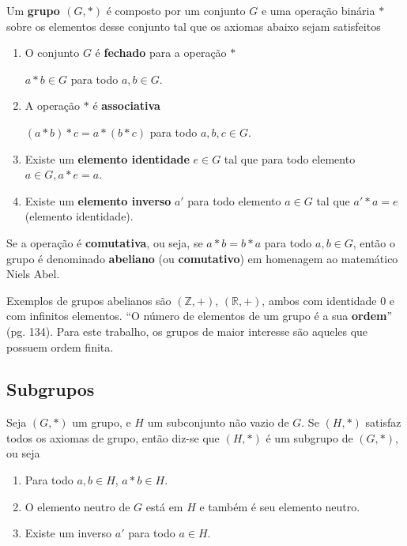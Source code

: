 Um \textbf{grupo \((G,*)\)} é composto por um conjunto \(G\) e uma operação binária \(*\) sobre os elementos desse conjunto tal que os axiomas abaixo sejam satisfeitos \cite{Gilbert:2004}

\begin{enumerate}
\item O conjunto \(G\) é \textbf{fechado} para a operação \(*\)

$a * b \in G$ para todo $a,b \in G$.

\item A operação $*$ é \textbf{associativa}

$(a * b) * c = a * (b * c)$ para todo $a,b,c \in G$.

\item Existe um \textbf{elemento identidade} $e \in G$ tal que para todo elemento $a \in G, a * e = a$.
\item Existe um \textbf{elemento inverso} \(a'\) para todo elemento $a \in G$ tal que $a' * a = e$ (elemento identidade).
\end{enumerate}

Se a operação é \textbf{comutativa}, ou seja, se $a * b = b * a$ para todo $a, b \in G$, então o grupo é denominado \textbf{abeliano} (ou \textbf{comutativo}) em homenagem ao matemático Niels Abel. \cite{Gilbert:2004}

Exemplos de grupos abelianos são $(\mathds{Z}, +)$, $(\mathds{R}, +)$, ambos com identidade 0 e com infinitos elementos. ``O número de elementos de um grupo é a sua \textbf{ordem}'' \cite{Coutinho:2014} (pg. 134). Para este trabalho, os grupos de maior interesse são aqueles que possuem ordem finita.

%
%
\subsection{Subgrupos}
Seja $(G, *)$ um grupo, e \(H\) um subconjunto não vazio de \(G\). Se $(H, *)$ satisfaz todos os axiomas de grupo, então diz-se que $(H, *)$ é um subgrupo de $(G, *)$\cite{Coutinho:2014}, ou seja

\begin{enumerate}
\item Para todo $a, b \in H$, $a * b \in H$.
\item O elemento neutro de \(G\) está em \(H\) e também é seu elemento neutro.
\item Existe um inverso \(a'\) para todo $a \in H$.
\end{enumerate}

